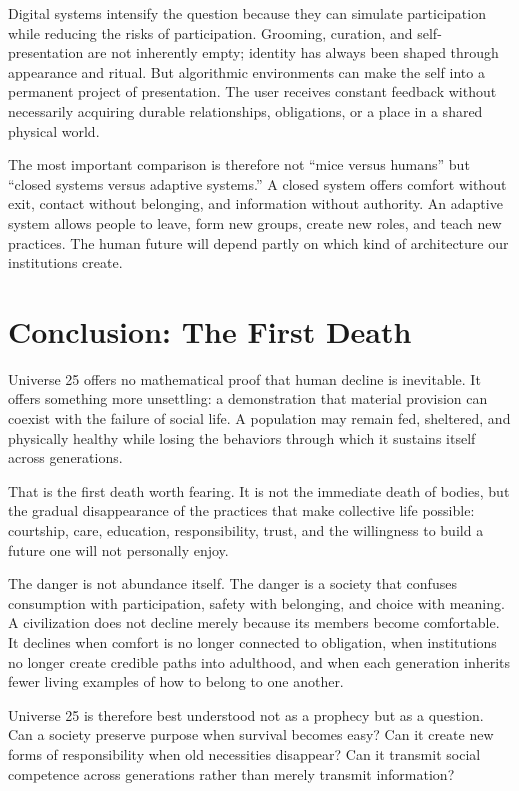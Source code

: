 ﻿\documentclass[12pt,a4paper]{book}
\begin{document}
Digital systems intensify the question because they can simulate participation while reducing the risks of participation. Grooming, curation, and self-presentation are not inherently empty; identity has always been shaped through appearance and ritual. But algorithmic environments can make the self into a permanent project of presentation. The user receives constant feedback without necessarily acquiring durable relationships, obligations, or a place in a shared physical world.

The most important comparison is therefore not ``mice versus humans'' but ``closed systems versus adaptive systems.'' A closed system offers comfort without exit, contact without belonging, and information without authority. An adaptive system allows people to leave, form new groups, create new roles, and teach new practices. The human future will depend partly on which kind of architecture our institutions create.

\section{Conclusion: The First Death}

Universe 25 offers no mathematical proof that human decline is inevitable. It offers something more unsettling: a demonstration that material provision can coexist with the failure of social life. A population may remain fed, sheltered, and physically healthy while losing the behaviors through which it sustains itself across generations.

That is the first death worth fearing. It is not the immediate death of bodies, but the gradual disappearance of the practices that make collective life possible: courtship, care, education, responsibility, trust, and the willingness to build a future one will not personally enjoy.

The danger is not abundance itself. The danger is a society that confuses consumption with participation, safety with belonging, and choice with meaning. A civilization does not decline merely because its members become comfortable. It declines when comfort is no longer connected to obligation, when institutions no longer create credible paths into adulthood, and when each generation inherits fewer living examples of how to belong to one another.

Universe 25 is therefore best understood not as a prophecy but as a question. Can a society preserve purpose when survival becomes easy? Can it create new forms of responsibility when old necessities disappear? Can it transmit social competence across generations rather than merely transmit information?
\end{document}
